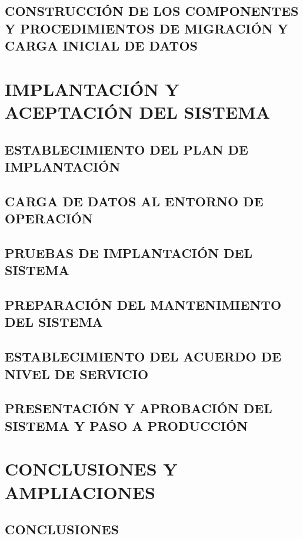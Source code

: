 \documentclass[11pt]{report}
\begin{document}
\newpage
\section{CONSTRUCCIÓN DE LOS COMPONENTES Y PROCEDIMIENTOS DE MIGRACIÓN Y CARGA INICIAL DE DATOS}



\newpage
\chapter{IMPLANTACIÓN Y ACEPTACIÓN DEL SISTEMA}
	

\newpage

\section{ESTABLECIMIENTO DEL PLAN DE IMPLANTACIÓN}


\newpage
\section{CARGA DE DATOS AL ENTORNO DE OPERACIÓN}


\newpage
\section{PRUEBAS DE IMPLANTACIÓN DEL SISTEMA}


\newpage
\section{PREPARACIÓN DEL MANTENIMIENTO DEL SISTEMA}


\newpage
\section{ESTABLECIMIENTO DEL ACUERDO DE NIVEL DE SERVICIO}


\newpage
\section{PRESENTACIÓN Y APROBACIÓN DEL SISTEMA Y PASO A PRODUCCIÓN}


\newpage
\chapter{CONCLUSIONES Y AMPLIACIONES}
\newpage

\section{CONCLUSIONES}
\end{document}

